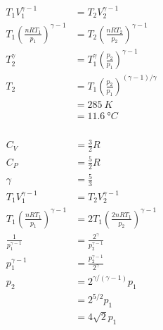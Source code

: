 \documentclass{article}
\begin{document}
\setcounter{subsubsection}{30}
\subsubsection{}

\begin{align*}
  T_1 V_1^{\gamma - 1}                                & = T_2 V_2^{\gamma - 1}                                       \\
  T_1 \left( \frac{n R T_1}{p_1} \right)^{\gamma - 1} & = T_2 \left( \frac{n R T_2}{p_2} \right)^{\gamma - 1}        \\
  T_2^\gamma                                          & = T_1^\gamma \left( \frac{p_2}{p_1} \right)^{\gamma - 1}     \\
  T_2                                                 & = T_1 \left( \frac{p_2}{p_1} \right)^{(\gamma - 1) / \gamma} \\
                                                      & = \qty{285}{K}                                               \\
                                                      & = \qty{11.6}{\degree C}
\end{align*}

\setcounter{subsubsection}{32}
\subsubsection{}

\begin{align*}
  C_V                                                 & = \frac{3}{2} R                                           \\
  C_P                                                 & = \frac{5}{2} R                                           \\
  \gamma                                              & = \frac{5}{3}                                             \\
  T_1 V_1^{\gamma - 1}                                & = T_2 V_2^{\gamma - 1}                                    \\
  T_1 \left( \frac{n R T_1}{p_1} \right)^{\gamma - 1} & = 2 T_1 \left( \frac{2 n R T_1}{p_2} \right)^{\gamma - 1} \\
  \frac{1}{p_1^{\gamma - 1}}                          & = \frac{2^\gamma}{p_2^{\gamma - 1}}                       \\
  p_1^{\gamma - 1}                                    & = \frac{p_2^{\gamma - 1}}{2^\gamma}                       \\
  p_2                                                 & = 2^{\gamma / (\gamma - 1)} p_1                           \\
                                                      & = 2^{5 / 2} p_1                                           \\
                                                      & = 4 \sqrt{2} p_1
\end{align*}
\end{document}
